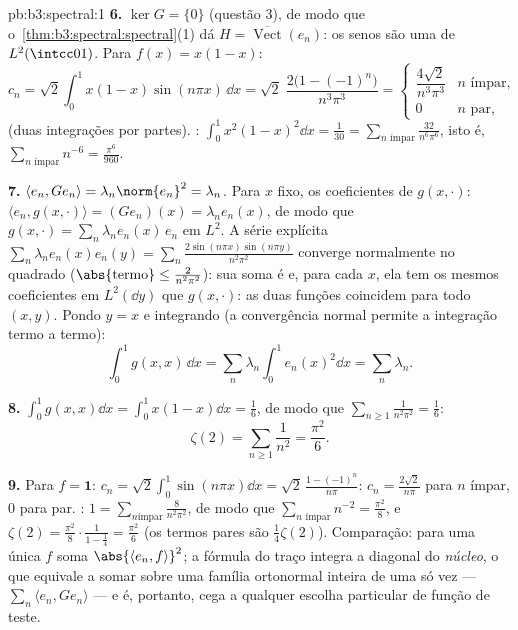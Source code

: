 \begin{solution}{pb:b3:spectral:1}
\textbf{6.} $\ker G = \{0\}$ (questão 3), de modo que
o~\cref{thm:b3:spectral:spectral}(1) dá $H =
\overline{\operatorname{Vect}}(e_n)$: os senos são uma  de $L^2(\intcc01)$. Para $f(x) = x(1 - x)$:
\[
c_n = \sqrt2\int_0^1x(1-x)\sin(n\pi x)\,\dd x
= \sqrt2\;\frac{2\bigl(1 - (-1)^n\bigr)}{n^3\pi^3}
= \begin{cases}\dfrac{4\sqrt2}{n^3\pi^3} & n \text{ ímpar},\\
0 & n \text{ par},\end{cases}
\]
(duas integrações por partes). : $\int_0^1x^2(1-x)^2\dd
x = \frac1{30} = \sum_{n \text{ ímpar}}\frac{32}{n^6\pi^6}$,
isto é, $\sum_{n\text{ ímpar}}n^{-6} = \frac{\pi^6}{960}$.

\textbf{7.} $\langle e_n, Ge_n\rangle = \lambda_n\norm{e_n}^2
= \lambda_n$. Para $x$ fixo, os coeficientes de $g(x,
\cdot)$: $\langle e_n, g(x,\cdot)\rangle = (Ge_n)(x) =
\lambda_ne_n(x)$, de modo que $g(x,\cdot) =
\sum_n\lambda_ne_n(x)\,e_n$ em $L^2$. A série explícita
$\sum_n\lambda_ne_n(x)e_n(y) = \sum_n\frac{2\sin(n\pi
x)\sin(n\pi y)}{n^2\pi^2}$ converge normalmente no quadrado
($\abs{\text{termo}} \leq \frac2{n^2\pi^2}$): sua soma é
 e, para cada $x$, ela tem os mesmos
coeficientes em $L^2(\dd y)$ que $g(x, \cdot)$: as duas funções 
coincidem para todo $(x, y)$. Pondo $y = x$ e
integrando (a convergência normal permite a integração termo a
termo):
\[
\int_0^1g(x,x)\,\dd x =
\sum_n\lambda_n\int_0^1e_n(x)^2\dd x = \sum_n\lambda_n .
\]

\textbf{8.} $\int_0^1g(x,x)\dd x = \int_0^1x(1 - x)\dd x =
\frac16$, de modo que $\sum_{n\geq1}\frac1{n^2\pi^2} = \frac16$:
\[
\zeta(2) = \sum_{n\geq1}\frac1{n^2} = \frac{\pi^2}6 .
\]

\textbf{9.} Para $f = \mathbf 1$: $c_n =
\sqrt2\int_0^1\sin(n\pi x)\dd x = \sqrt2\,\frac{1 -
(-1)^n}{n\pi}$: $c_n = \frac{2\sqrt2}{n\pi}$ para $n$ ímpar, $0$
para par. : $1 = \sum_{n\text{
ímpar}}\frac{8}{n^2\pi^2}$, de modo que $\sum_{n\text{ ímpar}}n^{-2} =
\frac{\pi^2}8$, e $\zeta(2) = \frac{\pi^2}8\cdot\frac{1}{1
- \frac14} = \frac{\pi^2}6$ (os termos pares são $\frac14\zeta(2)$).
Comparação:  para uma única $f$ soma
$\abs{\langle e_n, f\rangle}^2$; a fórmula do traço integra
a diagonal do \emph{núcleo}, o que equivale a somar
 sobre uma família ortonormal inteira de uma só vez ---
$\sum_n\langle e_n, Ge_n\rangle$ --- e é, portanto, cega a
qualquer escolha particular de função de teste.


\end{solution}
